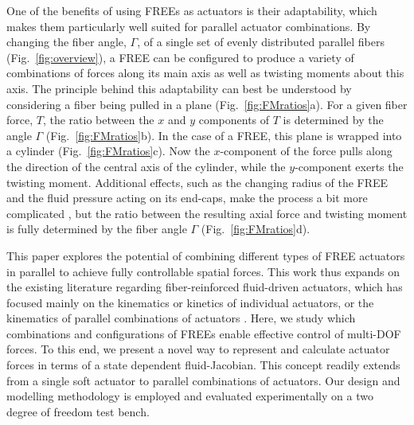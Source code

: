 One of the benefits of using FREEs as actuators is their adaptability, which makes them particularly well suited for parallel actuator combinations. 
By changing the fiber angle, $\Gamma$, of a single set of evenly distributed parallel fibers (Fig.~\ref{fig:overview}), a FREE can be configured to produce a variety of combinations of forces along its main axis as well as twisting moments about this axis.
The principle behind this adaptability can best be understood by considering a fiber being pulled in a plane (Fig.~\ref{fig:FMratios}a).
For a given fiber force, $T$, the ratio between the $x$ and $y$ components of $T$ is determined by the angle $\Gamma$ (Fig.~\ref{fig:FMratios}b). 
In the case of a FREE, this plane is wrapped into a cylinder (Fig.~\ref{fig:FMratios}c). 
Now the $x$-component of the force pulls along the direction of the central axis of the cylinder, while the $y$-component exerts the twisting moment.
Additional effects, such as the changing radius of the FREE and the fluid pressure acting on its end-caps, make the process a bit more complicated \cite{bruder2017model}, but the ratio between the resulting axial force and twisting moment is fully determined by the fiber angle $\Gamma$ (Fig.~\ref{fig:FMratios}d).


This paper explores the potential of combining different types of FREE actuators in parallel to achieve fully controllable spatial forces.
This work thus expands on the existing literature regarding fiber-reinforced fluid-driven actuators, which has focused mainly on the kinematics  \cite{bishop2015design, connolly2015mechanical, felt2018closed, krishnan2015kinematics} or kinetics \cite{bishop2013force, bruder2017model, sedal2017constitutive} of individual actuators, or the kinematics of parallel combinations of actuators \cite{bishop2012parallel, bishop2012parallelsynth}.
Here, we study which combinations and configurations of FREEs enable effective control of multi-DOF forces.
To this end, we present a novel way to represent and calculate actuator forces in terms of a state dependent fluid-Jacobian.
This concept readily extends from a single soft actuator to parallel combinations of actuators.
Our design and modelling methodology is employed and evaluated experimentally on a two degree of freedom test bench.




